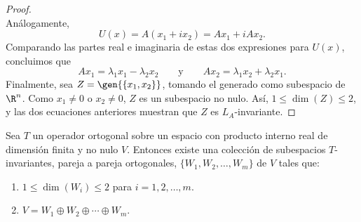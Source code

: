 \begin{proof}
\begin{equation*}
    \end{equation*}
    Análogamente,
    \begin{equation*}
        U(x)=A(x_1+ix_2)=Ax_1+iAx_2.
    \end{equation*}
    Comparando las partes real e imaginaria de estas dos expresiones para $U(x)$, concluimos que
    \begin{equation*}
        Ax_1=\lambda_1x_1-\lambda_2x_2 \qquad\text{y}\qquad Ax_2=\lambda_1x_2+\lambda_2x_1.
    \end{equation*}
    Finalmente, sea $Z=\gen{\{x_1,x_2\}}$, tomando el generado como subespacio de $\R^n$. Como $x_1\neq0$ o $x_2\neq0$, $Z$ es un subespacio no nulo. Así, $1\leq\dim(Z)\leq 2$, y las dos ecuaciones anteriores muestran que $Z$ es $L_A$-invariante.
\end{proof}

\begin{teorema}
    Sea $T$ un operador ortogonal sobre un espacio con producto interno real de dimensión finita y no nulo $V$. Entonces existe una colección de subespacios $T$-invariantes, pareja a pareja ortogonales, $\{W_1,W_2,\dots,W_m\}$ de $V$ tales que:
    \begin{enumerate}[label=(\alph*)]
        \item $1\leq\dim(W_i)\leq 2$ para $i=1,2,\dots,m$.
        \item $V=W_1\oplus W_2\oplus\cdots\oplus W_m$.
    \end{enumerate}
\end{teorema}

